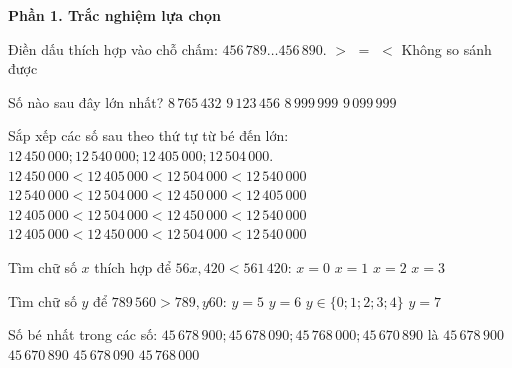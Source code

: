 \textbf{Phần 1. Trắc nghiệm lựa chọn}

\begin{ex} %
Điền dấu thích hợp vào chỗ chấm: $456\,789 \dots 456\,890$.
\choice
{$>$}
{$=$}
{\True $<$}
{Không so sánh được}
\end{ex}

\begin{ex} %
Số nào sau đây lớn nhất?
\choice
{$8\,765\,432$}
{\True $9\,123\,456$}
{$8\,999\,999$}
{$9\,099\,999$}
\end{ex}

\begin{ex} %
Sắp xếp các số sau theo thứ tự từ bé đến lớn: $12\,450\,000; 12\,540\,000; 12\,405\,000; 12\,504\,000$.
\choice
{$12\,450\,000 < 12\,405\,000 < 12\,504\,000 < 12\,540\,000$}
{$12\,540\,000 < 12\,504\,000 < 12\,450\,000 < 12\,405\,000$}
{$12\,405\,000 < 12\,504\,000 < 12\,450\,000 < 12\,540\,000$}
{\True $12\,405\,000 < 12\,450\,000 < 12\,504\,000 < 12\,540\,000$}
\end{ex}

\begin{ex} %
Tìm chữ số $x$ thích hợp để $56x,420 < 561\,420$:
\choice
{\True $x = 0$}
{$x = 1$}
{$x = 2$}
{$x = 3$}
\end{ex}

\begin{ex} %
Tìm chữ số $y$ để $789\,560 > 789,y60$:
\choice
{$y = 5$}
{$y = 6$}
{\True $y \in \{0; 1; 2; 3; 4\}$}
{$y = 7$}
\end{ex}

\begin{ex} %
Số bé nhất trong các số: $45\,678\,900; 45\,678\,090; 45\,768\,000; 45\,670\,890$ là
\choice
{$45\,678\,900$}
{\True $45\,670\,890$}
{$45\,678\,090$}
{$45\,768\,000$}
\end{ex}

